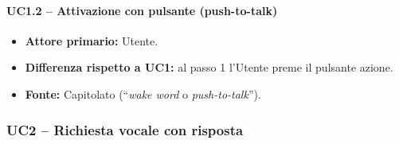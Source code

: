 \documentclass[12pt,a4paper]{article}
\newcommand{\tightlist}{\setlength{\itemsep}{1pt}\setlength{\parskip}{0pt}}
\begin{document}
\paragraph{UC1.2 -- Attivazione con pulsante (push-to-talk)}
\begin{itemize}
\tightlist
\item \textbf{Attore primario:} Utente.
\item \textbf{Differenza rispetto a UC1:} al passo 1 l'Utente preme il pulsante azione.
\item \textbf{Fonte:} Capitolato (``\emph{wake word} o \emph{push-to-talk}'').
\end{itemize}

\subsubsection{UC2 -- Richiesta vocale con risposta}
\end{document}
